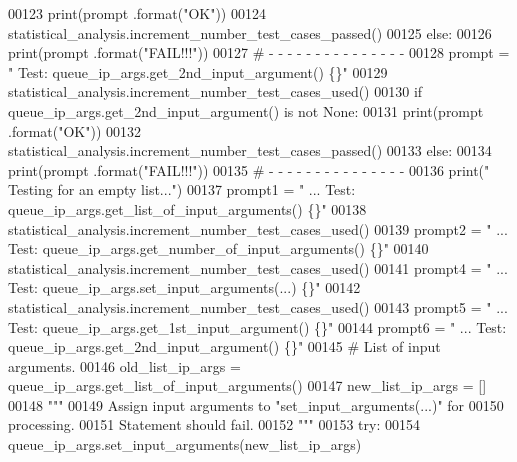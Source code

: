 \begin{DoxyCode}
00123             print(prompt .format(\textcolor{stringliteral}{"OK"}))
00124             statistical\_analysis.increment\_number\_test\_cases\_passed()
00125         \textcolor{keywordflow}{else}:
00126             print(prompt .format(\textcolor{stringliteral}{"FAIL!!!"}))
00127         \textcolor{comment}{#   -   -   -   -   -   -   -   -   -   -   -   -   -   -   -}
00128         prompt = \textcolor{stringliteral}{"  Test: queue\_ip\_args.get\_2nd\_input\_argument()        \{\}"}
00129         statistical\_analysis.increment\_number\_test\_cases\_used()
00130         \textcolor{keywordflow}{if} queue\_ip\_args.get\_2nd\_input\_argument() \textcolor{keywordflow}{is} \textcolor{keywordflow}{not} \textcolor{keywordtype}{None}:
00131             print(prompt .format(\textcolor{stringliteral}{"OK"}))
00132             statistical\_analysis.increment\_number\_test\_cases\_passed()
00133         \textcolor{keywordflow}{else}:
00134             print(prompt .format(\textcolor{stringliteral}{"FAIL!!!"}))
00135         \textcolor{comment}{#   -   -   -   -   -   -   -   -   -   -   -   -   -   -   -}
00136         print(\textcolor{stringliteral}{" Testing for an empty list..."})
00137         prompt1 = \textcolor{stringliteral}{" ... Test: queue\_ip\_args.get\_list\_of\_input\_arguments()   \{\}"}
00138         statistical\_analysis.increment\_number\_test\_cases\_used()
00139         prompt2 = \textcolor{stringliteral}{" ... Test: queue\_ip\_args.get\_number\_of\_input\_arguments() \{\}"}
00140         statistical\_analysis.increment\_number\_test\_cases\_used()
00141         prompt4 = \textcolor{stringliteral}{" ... Test: queue\_ip\_args.set\_input\_arguments(...)    \{\}"}
00142         statistical\_analysis.increment\_number\_test\_cases\_used()
00143         prompt5 = \textcolor{stringliteral}{" ... Test: queue\_ip\_args.get\_1st\_input\_argument()    \{\}"}
00144         prompt6 = \textcolor{stringliteral}{" ... Test: queue\_ip\_args.get\_2nd\_input\_argument()    \{\}"}
00145         \textcolor{comment}{#   List of input arguments.}
00146         old\_list\_ip\_args = queue\_ip\_args.get\_list\_of\_input\_arguments()
00147         new\_list\_ip\_args = []
00148         \textcolor{stringliteral}{"""}
00149 \textcolor{stringliteral}{            Assign input arguments to "set\_input\_arguments(...)" for}
00150 \textcolor{stringliteral}{                processing.}
00151 \textcolor{stringliteral}{            Statement should fail.}
00152 \textcolor{stringliteral}{        """}
00153         \textcolor{keywordflow}{try}:
00154             queue\_ip\_args.set\_input\_arguments(new\_list\_ip\_args)

\end{DoxyCode}
